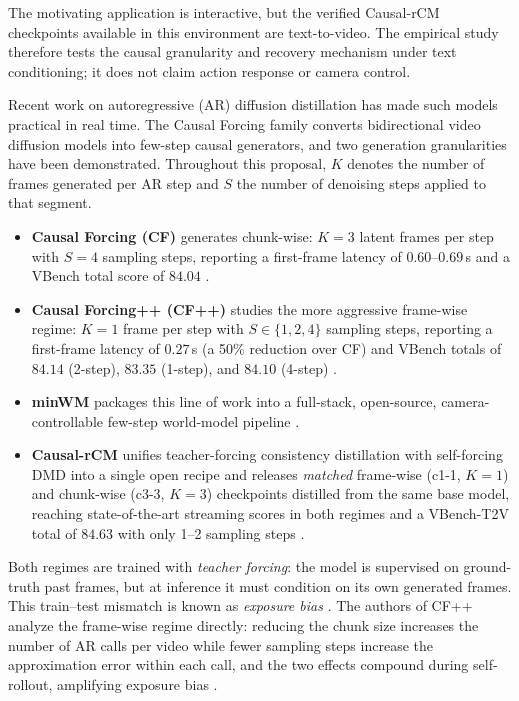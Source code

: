 \documentclass[11pt,a4paper]{article}
\begin{document}
The motivating application is interactive, but the verified Causal-rCM checkpoints available in this environment are text-to-video. The empirical study therefore tests the causal granularity and recovery mechanism under text conditioning; it does not claim action response or camera control.

Recent work on autoregressive (AR) diffusion distillation has made such models practical in real time. The Causal Forcing family converts bidirectional video diffusion models into few-step causal generators, and two generation granularities have been demonstrated. Throughout this proposal, $K$ denotes the number of frames generated per AR step and $S$ the number of denoising steps applied to that segment.

\begin{itemize}[leftmargin=1.6em, itemsep=2pt]
\item \textbf{Causal Forcing (CF)} generates chunk-wise: $K=3$ latent frames per step with $S=4$ sampling steps, reporting a first-frame latency of $0.60$--$0.69$\,s and a VBench total score of $84.04$ \parencite{zhuCausalForcingAutoregressive2026a}.
\item \textbf{Causal Forcing++ (CF++)} studies the more aggressive frame-wise regime: $K=1$ frame per step with $S\in\{1,2,4\}$ sampling steps, reporting a first-frame latency of $0.27$\,s (a 50\% reduction over CF) and VBench totals of $84.14$ (2-step), $83.35$ (1-step), and $84.10$ (4-step) \parencite{zhaoCausalForcingScalable2026a}.
\item \textbf{minWM} packages this line of work into a full-stack, open-source, camera-controllable few-step world-model pipeline \parencite{zhaoMinWMFullStackOpenSource2026a}.
\item \textbf{Causal-rCM} unifies teacher-forcing consistency distillation with self-forcing DMD into a single open recipe and releases \emph{matched} frame-wise (c1-1, $K=1$) and chunk-wise (c3-3, $K=3$) checkpoints distilled from the same base model, reaching state-of-the-art streaming scores in both regimes and a VBench-T2V total of $84.63$ with only 1--2 sampling steps \parencite{zhengCausalrCMUnifiedTeacherForcing2026}.
\end{itemize}

Both regimes are trained with \emph{teacher forcing}: the model is supervised on ground-truth past frames, but at inference it must condition on its own generated frames. This train--test mismatch is known as \emph{exposure bias} \parencite{huangSelfForcingBridging2025}. The authors of CF++ analyze the frame-wise regime directly: reducing the chunk size increases the number of AR calls per video while fewer sampling steps increase the approximation error within each call, and the two effects compound during self-rollout, amplifying exposure bias \parencite[Sec.~3.1]{zhaoCausalForcingScalable2026a}.
\end{document}
